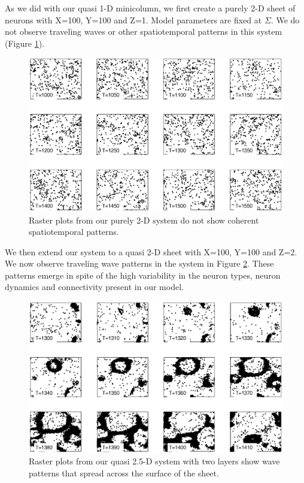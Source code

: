 As we did with our quasi 1-D minicolumn, we first create a purely 2-D sheet of neurons with X=100, Y=100 and Z=1.
Model parameters are fixed at $\Sigma$.
We do not observe traveling waves or other spatiotemporal patterns in this system (Figure \ref{fig:Pure2DRasters_NoWaves}).
\begin{figure}[!htb]
 \caption{ Raster plots from our purely 2-D system do not show coherent spatiotemporal patterns.}
 \label{fig:Pure2DRasters_NoWaves}
 \centering
   \includegraphics[width=\textwidth]{fig/2DWaveRasters_1LayerNoWaves}
\end{figure}

We then extend our system to a quasi 2-D sheet with X=100, Y=100 and Z=2.
We now observe traveling wave patterns in the system in Figure \ref{fig:2D_waves}.
These patterns emerge in spite of the high variability in the neuron types, neuron dynamics and connectivity present in our model.
\begin{figure}[!htb]
 \caption{ Raster plots from our quasi 2.5-D system with two layers show wave patterns that spread across the surface of the sheet.}
 \label{fig:2D_waves}
 \centering
   \includegraphics[width=\textwidth]{fig/2DWaveRasters}
\end{figure}

